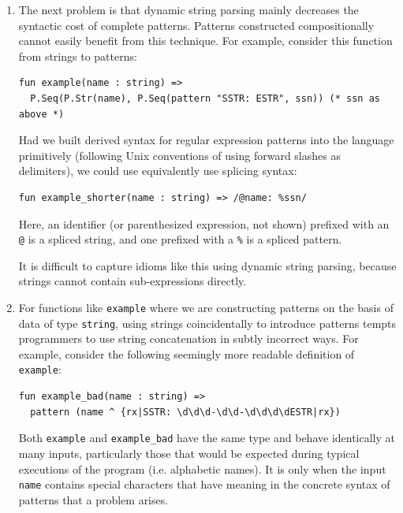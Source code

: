 \begin{enumerate}
\item The next problem is that dynamic string parsing mainly decreases the syntactic cost of complete patterns. Patterns constructed compositionally cannot easily benefit from this technique. For example, consider this function from strings to patterns:
\begin{lstlisting}[numbers=none]
fun example(name : string) => 
  P.Seq(P.Str(name), P.Seq(pattern "SSTR: ESTR", ssn)) (* ssn as above *)
\end{lstlisting}
Had we built derived syntax for regular expression patterns into the language primitively (following Unix conventions of using forward slashes as delimiters), we could use equivalently use splicing syntax:
\begin{lstlisting}[numbers=none]
fun example_shorter(name : string) => /@name: %ssn/
\end{lstlisting}
Here, an identifier (or parenthesized expression, not shown) prefixed with an \lstinline{@} is a spliced string, and one prefixed with a \lstinline{%} is a spliced pattern.

It is difficult to capture idioms like this using dynamic string parsing, because strings cannot contain sub-expressions directly. 


\item For functions like \lstinline{example} where we are constructing patterns on the basis of data of type \lstinline{string}, using strings coincidentally to introduce patterns tempts programmers to use string concatenation in subtly incorrect ways. For example, consider the following seemingly more readable definition of \lstinline{example}:
\begin{lstlisting}[numbers=none,escapechar=~]
fun example_bad(name : string) => 
  pattern (name ^ {rx|SSTR: \d\d\d-\d\d-\d\d\d\dESTR|rx})
\end{lstlisting}

Both \lstinline{example} and \lstinline{example_bad} have the same type and behave identically at many inputs, particularly those that would be expected during typical executions of the program (i.e. alphabetic names). It is only when the input \lstinline{name} contains special characters that have meaning in the concrete syntax of patterns that a problem arises. 


\end{enumerate}
